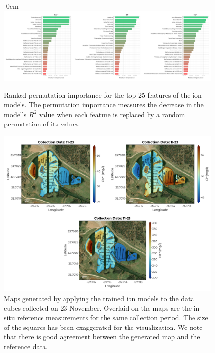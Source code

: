 \documentclass[remotesensing,article,accept,pdftex,moreauthors]{Definitions/mdpi}
\begin{document}
\vspace{-9pt}
\begin{figure}[H]
\begin{adjustwidth}{-\extralength}{0cm}
\centering
\vspace{-0.1in}
\includegraphics[width=18 cm]{figures/results/fits/ions-ranking.pdf}
\vspace{-0.1in}
\end{adjustwidth}
\caption{Ranked permutation importance for the top 25 features of the ion models. The permutation importance measures the decrease in the model's $R^2$ value when each feature is replaced by a random permutation of its values.\label{fig:ions-fi}}
\end{figure}  

\begin{figure}[H]

\vspace{-0.15in}
\hspace{-6pt}\includegraphics[width=\columnwidth]{figures/results/maps/ions.pdf}
\vspace{-0.1in}
\caption{Maps generated by applying the trained ion models to the data cubes collected on 23 November. Overlaid on the maps are the in situ reference measurements for the same collection period. The size of the squares has been exaggerated for the visualization. We note that there is good agreement between the generated map and the reference data. \label{fig:map-ions}}
\end{figure}  
\end{document}
